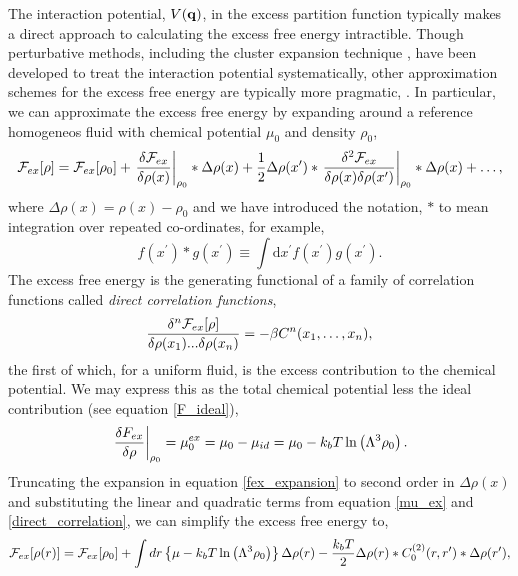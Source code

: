The interaction potential, $V(\mathbf{q})$, in the excess partition function typically
makes a direct approach to calculating the excess free energy intractible.
Though perturbative methods, including the cluster expansion technique
\cite{MAYER41}, have been developed to treat the interaction potential
systematically, other approximation schemes for the excess free energy are
typically more pragmatic, .  In particular, we can approximate the excess free
energy by expanding around a reference homogeneos fluid with chemical potential
$\mu_0$ and density $\rho_0$,
%
\begin{equation}
    \label{fex_expansion}
    \mathcal{F}_{ex}[\rho] = \mathcal{F}_{ex}[\rho_0]
        + \left . \frac{\delta \mathcal{F}_{ex}}{\delta\rho(x)} \right\vert_{\rho_0} \ast \Delta\rho(x) 
        + \frac{1}{2} \Delta\rho(x^\prime) \ast
            \left . \frac{\delta^2 \mathcal{F}_{ex}}{\delta\rho(x)\delta\rho(x^\prime)}
            \right\vert_{\rho_0} \ast \Delta\rho(x) 
        + \dots,
\end{equation}
%
where $\Delta\rho(x) = \rho(x) - \rho_0$ and we have introduced the notation,
$\ast$ to mean integration over repeated co-ordinates, for example,
%
\begin{equation}
    f(x^\prime) \ast g(x^\prime)
        \equiv \int\mathrm{d}x^\prime f(x^\prime) g(x^\prime).
\end{equation}
%
The excess free energy is the generating functional of a family of correlation
functions called \textit{direct correlation functions}, 
%
\begin{equation}
    \label{direct_correlation}
    \frac{\delta^n \mathcal{F}_{ex}[\rho]}{\delta \rho(x_1) ... \delta \rho(x_n)}
        = -\beta C^{n}(x_1, \dots, x_n),
\end{equation}
%
the first of which, for a uniform fluid, is the excess contribution to the
chemical potential. We may express  this as the total chemical potential less
the ideal contribution (see equation \ref{F_ideal}), 
%
\begin{equation}
    \label{mu_ex}
    \left.\frac{\delta F_{ex}}{\delta \rho}\right\vert_{\rho_0}
        = \mu_0^{ex}
        = \mu_0 - \mu_{id} 
        = \mu_0 - k_bT\ln\left(\Lambda^3 \rho_0\right).
\end{equation}
%
Truncating the expansion in equation \ref{fex_expansion} to second order in
$\Delta\rho(x)$ and substituting the linear and quadratic terms from  equation
\ref{mu_ex} and \ref{direct_correlation}, we can simplify the excess free energy
to,
%
\begin{equation}
    \label{F_ex}
    \mathcal{F}_{ex}[\rho(r)] = \mathcal{F}_{ex}[\rho_0] 
        + \int dr 
            \left\lbrace\mu - k_bT \ln\left(\Lambda^3 \rho_0 \right)
            \right\rbrace \Delta\rho(r)
        - \frac{k_b T}{2} \Delta\rho(r) \ast C^{(2)}_0(r, r^\prime) 
            \ast \Delta\rho(r^\prime),
\end{equation}
